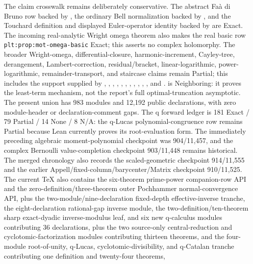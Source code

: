 \documentclass[11pt,oneside]{article}
\theoremstyle{definition}
\theoremstyle{remark}
\begin{document}
The claim crosswalk remains deliberately conservative.  The abstract
Fa\`a di Bruno row backed by , the ordinary Bell
normalization backed by , and the Touchard
definition and displayed Euler-operator identity backed by
 are Exact.  The incoming real-analytic
Wright omega theorem also makes the real basic row
\nolinkurl{plt:prop:mot-omega-basic} Exact; this asserts no complex holomorphy.
The broader Wright-omega,
differential-closure, harmonic-increment, Cayley-tree, derangement,
Lambert-correction, residual/bracket, linear-logarithmic, power-logarithmic,
remainder-transport, and staircase claims remain Partial; this includes the
support supplied by ,
, ,
,
, ,
, ,
, ,
, and .
 is Neighboring: it proves the least-term mechanism,
not the report's full optimal-truncation asymptotic.
The present union has 983 modules and 12,192 public declarations, with zero
module-header or declaration-comment gaps.  The q forward ledger is
181 Exact / 79 Partial / 14 None / 8 N/A: the q-Lucas polynomial-congruence
row remains Partial because Lean currently proves its root-evaluation form.
The immediately preceding algebraic moment-polynomial checkpoint was
904/11,457, and the complex Bernoulli value-completion checkpoint 903/11,448
remains historical.  The merged chronology also records the scaled-geometric
checkpoint 914/11,555 and the earlier
Appell/fixed-column/barycenter/Matrix checkpoint 910/11,525.  The current TeX also
contains the six-theorem prime-power companion-row API and the
zero-definition/three-theorem outer Pochhammer normal-convergence API, plus
the two-module/nine-declaration fixed-depth effective-inverse tranche, the
eight-declaration rational-gap inverse module, the two-definition/ten-theorem
sharp exact-dyadic inverse-modulus leaf, and six new
q-calculus modules contributing 36 declarations, plus the two source-only
central-reduction and cyclotomic-factorization modules contributing thirteen
theorems, and the four-module root-of-unity, q-Lucas, cyclotomic-divisibility,
and q-Catalan tranche contributing one definition and twenty-four theorems,
\end{document}
